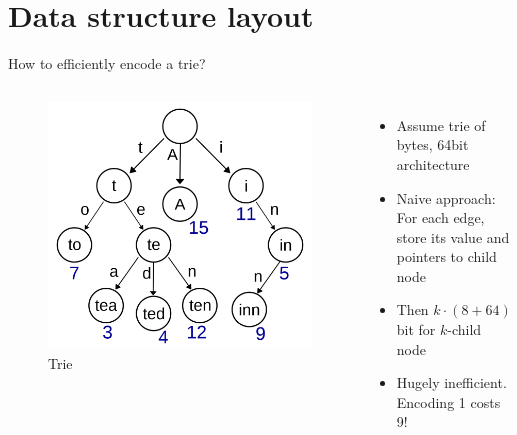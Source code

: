 \documentclass{beamer}
\begin{document}
\section{Data structure layout}

\begin{frame}{How to efficiently encode a trie?}
		\begin{columns}
				\begin{figure}
						\centering
						\includegraphics[width=\textwidth]{resources/trie.png}
						\caption{Trie \autocite{booyabazookaTrieExampleSvg}}
				\end{figure}
				\begin{itemize}
						\item Assume trie of bytes, 64bit architecture
						\item Naive approach: For each edge, store its value and
								pointers to child node
						\item Then $k \cdot (8 + 64)$ bit for $k$-child node
						\item Hugely inefficient. Encoding \qty{1}{\byte} costs
								\qty{9}{\byte}!
				\end{itemize}
		\end{columns}
\end{frame}
\end{document}
